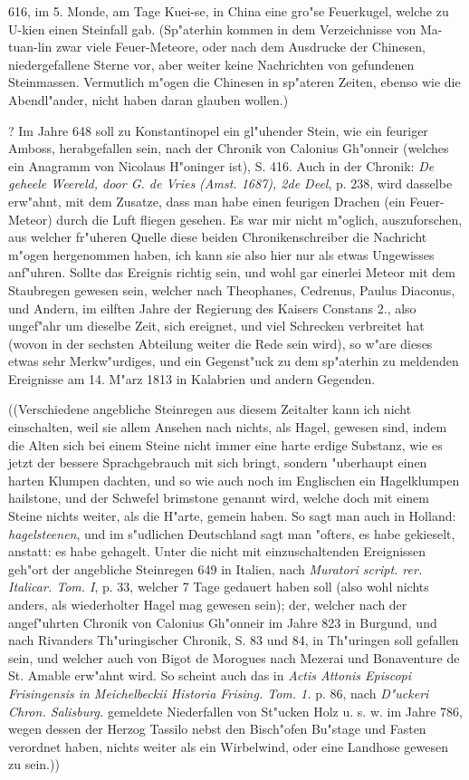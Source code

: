 \documentclass[a4paper, 11pt, oneside, polutonikogreek, german]{article}
\begin{document}
616, im 5. Monde, am Tage Kuei-se, in China eine gro"se Feuerkugel, welche zu U-kien einen Steinfall gab. (Sp"aterhin kommen in dem Verzeichnisse von Ma-tuan-lin zwar viele Feuer-Meteore, oder nach dem Ausdrucke der Chinesen, niedergefallene Sterne vor, aber weiter keine Nachrichten von gefundenen Steinmassen. Vermutlich m"ogen die Chinesen in sp"ateren Zeiten, ebenso wie die Abendl"ander, nicht haben daran glauben wollen.)

? Im Jahre 648 soll zu Konstantinopel ein gl"uhender Stein, wie ein feuriger Amboss, herabgefallen sein, nach der Chronik von Calonius Gh"onneir (welches ein Anagramm von Nicolaus H"oninger ist), S. 416. Auch in der Chronik: \emph{De geheele Weereld, door G. de Vries (Amst. 1687), 2de Deel}, p. 238, wird dasselbe erw"ahnt, mit dem Zusatze, dass man habe einen feurigen Drachen (ein Feuer-Meteor) durch die Luft fliegen gesehen. Es war mir nicht m"oglich, auszuforschen, aus welcher fr"uheren Quelle diese beiden Chronikenschreiber die Nachricht m"ogen hergenommen haben, ich kann sie also hier nur als etwas Ungewisses anf"uhren. Sollte das Ereignis richtig sein, und wohl gar einerlei Meteor mit dem Staubregen gewesen sein, welcher nach Theophanes, Cedrenus, Paulus Diaconus, und Andern, im eilften Jahre der Regierung des Kaisers Constans 2., also ungef"ahr um dieselbe Zeit, sich ereignet, und viel Schrecken verbreitet hat (wovon in der sechsten Abteilung weiter die Rede sein wird), so w"are dieses etwas sehr Merkw"urdiges, und ein Gegenst"uck zu dem sp"aterhin zu meldenden Ereignisse am 14. M"arz 1813 in Kalabrien und andern Gegenden.

((Verschiedene angebliche Steinregen aus diesem Zeitalter kann ich nicht einschalten, weil sie allem Ansehen nach nichts, als Hagel, gewesen sind, indem die Alten sich bei einem Steine nicht immer eine harte erdige Substanz, wie es jetzt der bessere Sprachgebrauch mit sich bringt, sondern "uberhaupt einen harten Klumpen dachten, und so wie auch noch im Englischen ein Hagelklumpen hailstone, und der Schwefel brimstone genannt wird, welche doch mit einem Steine nichts weiter, als die H"arte, gemein haben. So sagt man auch in Holland: \emph{hagelsteenen}, und im s"udlichen Deutschland sagt man "ofters, es habe gekieselt, anstatt: es habe gehagelt. Unter die nicht mit einzuschaltenden Ereignissen geh"ort der angebliche Steinregen 649 in Italien, nach \emph{Muratori script. rer. Italicar. Tom. I}, p. 33, welcher 7 Tage gedauert haben soll (also wohl nichts anders, als wiederholter Hagel mag gewesen sein); der, welcher nach der angef"uhrten Chronik von Calonius Gh"onneir im Jahre 823 in Burgund, und nach Rivanders Th"uringischer Chronik, S. 83 und 84, in Th"uringen soll gefallen sein, und welcher auch von Bigot de Morogues nach Mezerai und Bonaventure de St. Amable erw"ahnt wird. So scheint auch das in \emph{Actis Attonis Episcopi Frisingensis in Meichelbeckii Historia Frising. Tom. 1.} p. 86, nach \emph{D"uckeri Chron. Salisburg.} gemeldete Niederfallen von St"ucken Holz u. s. w. im Jahre 786, wegen dessen der Herzog Tassilo nebst den Bisch"ofen Bu"stage und Fasten verordnet haben, nichts weiter als ein Wirbelwind, oder eine Landhose gewesen zu sein.))
\end{document}

